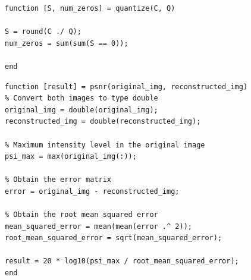 \documentclass{article}[a4paper]
\begin{document}
	\begin{lstlisting}[caption={Quantization}, label=quantize]
function [S, num_zeros] = quantize(C, Q)

S = round(C ./ Q);
num_zeros = sum(sum(S == 0));

end
	\end{lstlisting}
	
	\begin{lstlisting}[caption={PSNR Computation}, label=psnr]
function [result] = psnr(original_img, reconstructed_img)
% Convert both images to type double
original_img = double(original_img);
reconstructed_img = double(reconstructed_img);

% Maximum intensity level in the original image
psi_max = max(original_img(:));

% Obtain the error matrix
error = original_img - reconstructed_img;

% Obtain the root mean squared error
mean_squared_error = mean(mean(error .^ 2));
root_mean_squared_error = sqrt(mean_squared_error);

result = 20 * log10(psi_max / root_mean_squared_error);
end
	\end{lstlisting}
\end{document}
